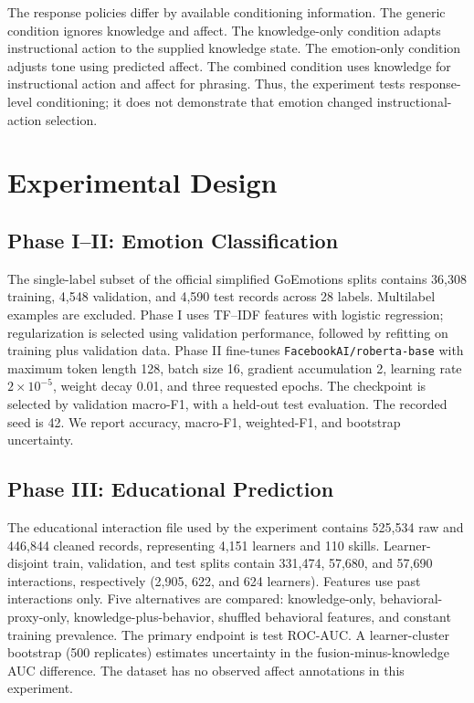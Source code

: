 \documentclass[conference]{IEEEtran}
\begin{document}
The response policies differ by available conditioning information. The generic condition ignores knowledge and affect. The knowledge-only condition adapts instructional action to the supplied knowledge state. The emotion-only condition adjusts tone using predicted affect. The combined condition uses knowledge for instructional action and affect for phrasing. Thus, the experiment tests response-level conditioning; it does not demonstrate that emotion changed instructional-action selection.

\section{Experimental Design}
\subsection{Phase I--II: Emotion Classification}
The single-label subset of the official simplified GoEmotions splits contains 36,308 training, 4,548 validation, and 4,590 test records across 28 labels. Multilabel examples are excluded. Phase I uses TF--IDF features with logistic regression; regularization is selected using validation performance, followed by refitting on training plus validation data. Phase II fine-tunes \texttt{FacebookAI/roberta-base} with maximum token length 128, batch size 16, gradient accumulation 2, learning rate $2\times10^{-5}$, weight decay 0.01, and three requested epochs. The checkpoint is selected by validation macro-F1, with a held-out test evaluation. The recorded seed is 42. We report accuracy, macro-F1, weighted-F1, and bootstrap uncertainty.
\subsection{Phase III: Educational Prediction}
The educational interaction file used by the experiment contains 525,534 raw and 446,844 cleaned records, representing 4,151 learners and 110 skills. Learner-disjoint train, validation, and test splits contain 331,474, 57,680, and 57,690 interactions, respectively (2,905, 622, and 624 learners). Features use past interactions only. Five alternatives are compared: knowledge-only, behavioral-proxy-only, knowledge-plus-behavior, shuffled behavioral features, and constant training prevalence. The primary endpoint is test ROC-AUC. A learner-cluster bootstrap (500 replicates) estimates uncertainty in the fusion-minus-knowledge AUC difference. The dataset has no observed affect annotations in this experiment.
\end{document}
